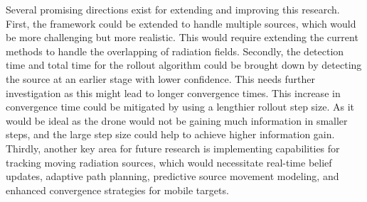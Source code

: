 \documentclass[../report.tex]{subfiles}
\begin{document}
    Several promising directions exist for extending and improving this research. First, the framework could be extended to handle multiple sources, which would be 
    more challenging but more realistic. This would require extending the current methods to handle the overlapping of radiation fields. Secondly, the detection time 
    and total time for the rollout algorithm could be brought down by detecting the source at an earlier stage with lower confidence. This needs further investigation as
    this might lead to longer convergence times. This increase in convergence time could be mitigated by using a lengthier rollout step size. As it would be 
    ideal as the drone would not be gaining much information in smaller steps, and the large step size could help to achieve higher information gain. Thirdly,
    another key area for future research is implementing capabilities for tracking moving radiation sources, which would necessitate real-time belief updates, 
    adaptive path planning, predictive source movement modeling, and enhanced convergence strategies for mobile targets.
\end{document}
